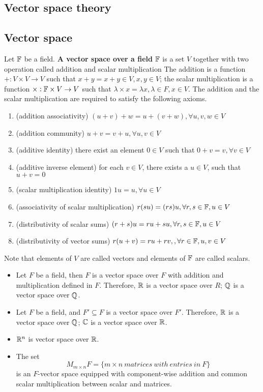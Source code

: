 \begin{refsection}
\section{Vector space theory}\label{ch:linearalgebra:sec:vector-space-theory}
\subsection{Vector space}
\begin{definition}
Let $\mathbb{F}$ be a field. \textbf{A vector space over a field} $\mathbb{F}$ is a set $V$ together with two operation called addition and scalar multiplication  The addition is a function $+: V\times V\to V $ such that $x + y = x+y\in V, x,y\in V$; the scalar multiplication is a function $\times: \mathbb{F}\times V \to V$ such that $\lambda\times x = \lambda x, \lambda\in F, x\in V$. The addition and the scalar multiplication are required to satisfy the following axioms.
\begin{enumerate}
\item (addition associativity) $(u+v)+w = u + (v+w), \forall u,v,w\in V$
\item (addition community) $u+v = v + u, \forall u,v \in V$
\item (additive identity) there exist an element $0 \in V$ such that $0+v=v,\forall v\in V$
\item (additive inverse element) for each $v\in V$, there exists a $u\in V$, such that $u+v=0$
\item (scalar multiplication identity) $1 u = u,\forall u\in V$
\item (associativity of scalar multiplication) $r(su)=(rs)u, \forall r,s\in \mathbb{F},u\in V$ 
\item (distributivity of scalar sums) $(r+s)u = ru+su, \forall r,s\in \mathbb{F},u\in V$
\item (distributivity of vector sums) $r(u+v)=ru+rv,, \forall r\in \mathbb{F},u,v\in V$
\end{enumerate}

Note that elements of $V$ are called vectors and elements of $\mathbb{F}$ are called scalars.
\end{definition}


\begin{example}\hfill
\begin{itemize}
	\item Let $F$ be a field, then $F$ is a vector space over $F$ with addition and multiplication defined in $F$. Therefore, $\mathbb{R}$ is a vector space over $R$; $\mathbb{Q}$ is a vector space over $\mathbb{Q}$.
	\item Let $F$ be a field, and $F'\subseteq F$ is a vector space over $F'$. Therefore, $\mathbb{R}$ is a vector space over $\mathbb{Q}$; $\mathbb{C}$ is a vector space over $\mathbb{R}$.
	\item $\mathbb{R}^n$ is vector space over $\mathbb{R}$.
	\item The set $$M_{m\times n} F = \{m\times n ~matrices~with~entries~in~F\}$$
is an $F$-vector space equipped with component-wise addition and common scalar multiplication between scalar and matrices.
  

\end{itemize}
\end{example}
\end{refsection}
